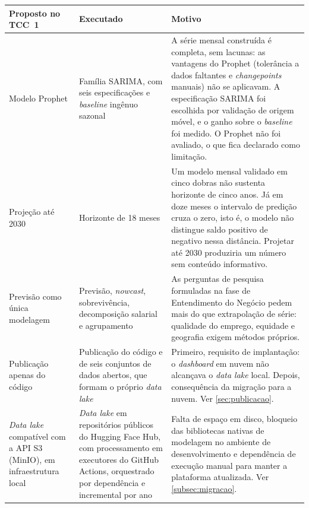 \begin{quadro}[htbp]
    \centering
    \caption{Revisões em relação à proposta apresentada no TCC~1}
    \label{quadro:revisoes}
    \footnotesize
    \renewcommand{\arraystretch}{1.3}
    \begin{tabularx}{\textwidth}{%
        >{\raggedright\arraybackslash\hsize=0.75\hsize}X
        >{\raggedright\arraybackslash\hsize=0.95\hsize}X
        >{\raggedright\arraybackslash\hsize=1.30\hsize}X}
        \toprule
        \rowcolor{black!8}
        \textbf{Proposto no TCC~1} & \textbf{Executado} & \textbf{Motivo} \\
        \midrule
        Modelo Prophet & Família SARIMA, com seis especificações e \textit{baseline} ingênuo sazonal & A série mensal construída é completa, sem lacunas: as vantagens do Prophet (tolerância a dados faltantes e \textit{changepoints} manuais) não se aplicavam. A especificação SARIMA foi escolhida por validação de origem móvel, e o ganho sobre o \textit{baseline} foi medido. O Prophet não foi avaliado, o que fica declarado como limitação. \\
        Projeção até 2030 & Horizonte de 18 meses & Um modelo mensal validado em cinco dobras não sustenta horizonte de cinco anos. Já em doze meses o intervalo de predição cruza o zero, isto é, o modelo não distingue saldo positivo de negativo nessa distância. Projetar até 2030 produziria um número sem conteúdo informativo. \\
        Previsão como única modelagem & Previsão, \textit{nowcast}, sobrevivência, decomposição salarial e agrupamento & As perguntas de pesquisa formuladas na fase de Entendimento do Negócio pedem mais do que extrapolação de série: qualidade do emprego, equidade e geografia exigem métodos próprios. \\
        Publicação apenas do código & Publicação do código e de seis conjuntos de dados abertos, que formam o próprio \textit{data lake} & Primeiro, requisito de implantação: o \textit{dashboard} em nuvem não alcançava o \textit{data lake} local. Depois, consequência da migração para a nuvem. Ver \autoref{sec:publicacao}. \\
        \textit{Data lake} compatível com a API S3 (MinIO), em infraestrutura local & \textit{Data lake} em repositórios públicos do Hugging Face Hub, com processamento em executores do GitHub Actions, orquestrado por dependência e incremental por ano & Falta de espaço em disco, bloqueio das bibliotecas nativas de modelagem no ambiente de desenvolvimento e dependência de execução manual para manter a plataforma atualizada. Ver \autoref{subsec:migracao}. \\

\end{tabularx}
\end{quadro}
